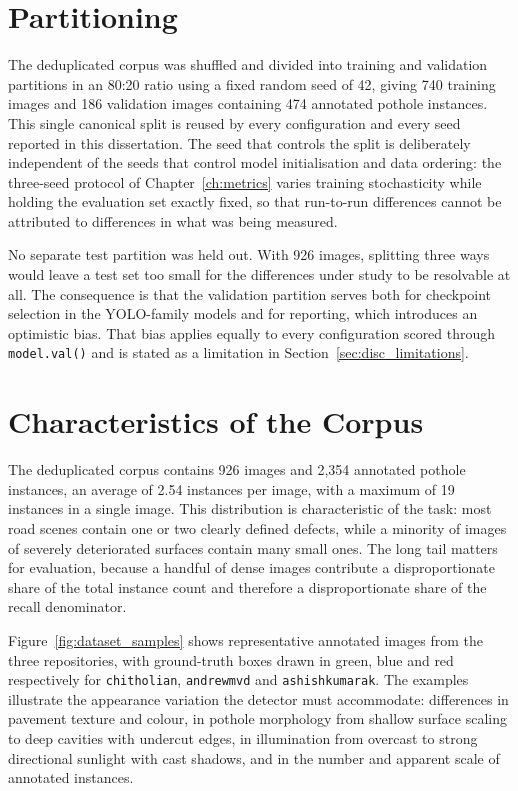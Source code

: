 \documentclass[MScCS]{uccthesis}
\begin{document}
\section{Partitioning}
\label{sec:partitioning}

The deduplicated corpus was shuffled and divided into training and validation
partitions in an 80:20 ratio using a fixed random seed of 42, giving 740
training images and 186 validation images containing 474 annotated pothole
instances. This single canonical split is reused by every configuration and
every seed reported in this dissertation. The seed that controls the split is
deliberately independent of the seeds that control model initialisation and
data ordering: the three-seed protocol of Chapter~\ref{ch:metrics} varies
training stochasticity while holding the evaluation set exactly fixed, so that
run-to-run differences cannot be attributed to differences in what was being
measured.

No separate test partition was held out. With 926 images, splitting three ways
would leave a test set too small for the differences under study to be
resolvable at all. The consequence is that the validation partition serves both
for checkpoint selection in the YOLO-family models and for reporting, which
introduces an optimistic bias. That bias applies equally to every configuration
scored through \texttt{model.val()} and is stated as a limitation in
Section~\ref{sec:disc_limitations}.

\section{Characteristics of the Corpus}
\label{sec:dataset_stats}

The deduplicated corpus contains 926 images and 2,354 annotated pothole
instances, an average of 2.54 instances per image, with a maximum of 19
instances in a single image. This distribution is characteristic of the task:
most road scenes contain one or two clearly defined defects, while a minority
of images of severely deteriorated surfaces contain many small ones. The
long tail matters for evaluation, because a handful of dense images contribute
a disproportionate share of the total instance count and therefore a
disproportionate share of the recall denominator.

Figure~\ref{fig:dataset_samples} shows representative annotated images from the
three repositories, with ground-truth boxes drawn in green, blue and red
respectively for \texttt{chitholian}, \texttt{andrewmvd} and
\texttt{ashishkumarak}. The examples illustrate the appearance variation the
detector must accommodate: differences in pavement texture and colour, in
pothole morphology from shallow surface scaling to deep cavities with
undercut edges, in illumination from overcast to strong directional sunlight
with cast shadows, and in the number and apparent scale of annotated instances.
\end{document}
